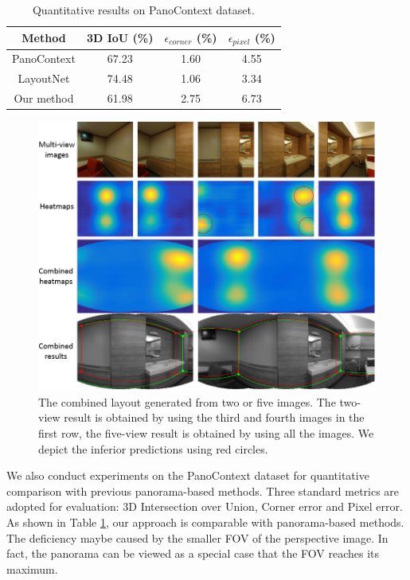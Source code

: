 \begin{table}
	\caption{Quantitative results on PanoContext dataset.}
	\label{tab:PC}
	\begin{tabular}{cccc}
		\toprule
		Method&3D IoU (\%)& $\epsilon_{corner}$ (\%) & $\epsilon_{pixel}$ (\%)\\
		\midrule
		PanoContext \cite{zhang2014panocontext} & 67.23 & 1.60 & 4.55\\
		LayoutNet \cite{zou2018layoutnet} & 74.48 & 1.06 & 3.34\\	
		Our method & 61.98 & 2.75 & 6.73\\	
		\bottomrule
	\end{tabular}
\end{table}

\begin{figure}
	\centering
	\includegraphics[width=\linewidth]{figs/partial2.png}
	\caption{The combined layout generated from two or five images. The two-view result is obtained by using the third and fourth images in the first row, the five-view result is obtained by using all the images. We depict the inferior predictions using red circles.}
	\label{fig:partial2}
\end{figure}


We also conduct experiments on the PanoContext dataset for quantitative comparison with previous panorama-based methods.
%
Three standard metrics are adopted for evaluation: 3D Intersection over Union, Corner error and Pixel error. As shown in Table \ref{tab:PC}, our approach is comparable with panorama-based methods. 
%
The deficiency maybe caused by the smaller FOV of the perspective image. In fact, the panorama can be viewed as a special case that the FOV reaches its maximum.

